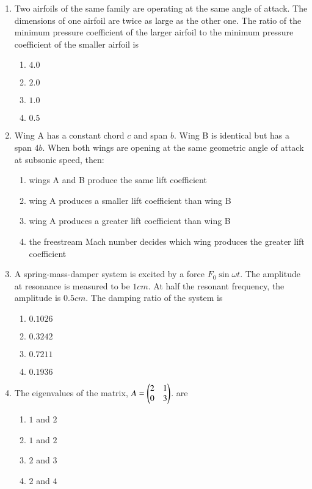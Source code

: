 \documentclass[journal]{IEEEtran}
\begin{document}
\begin{enumerate}
	\item 	Two airfoils of the same family are operating at the same angle of attack. The dimensions of one airfoil are twice as large as the other one. The ratio of the minimum pressure coefficient of the larger airfoil to the minimum pressure coefficient of the smaller airfoil is
		\begin{enumerate}
			\item $4.0$
    			\item $2.0$
    			\item $1.0$
    			\item $0.5$
		\end{enumerate}


	\item Wing A has a constant chord $c$ and span $b$. Wing B is identical but has a span $4b$. When both wings are opening at the same geometric angle of attack at subsonic speed, then:
		\begin{enumerate}
			\item wings A and B produce the same lift coefficient
			\item wing A produces a smaller lift coefficient than wing B
			\item wing A produces a greater lift coefficient than wing B
			\item the freestream Mach number decides which wing produces the greater lift coefficient
		\end{enumerate}


	\item A spring-mass-damper system is excited by a force $F_0 \sin \omega t$. The amplitude at resonance is measured to be $1cm$. At half the resonant frequency, the amplitude is $0.5cm$. The damping ratio of the system is
		\begin{enumerate}
			\item $0.1026$
			\item $0.3242$
			\item $0.7211$
			\item $0.1936$
		\end{enumerate}

	\item The eigenvalues of the matrix, $A = \begin{pmatrix}2&1\\0&3\end{pmatrix}$. are
		\begin{enumerate}
			\item $1$ and $2$
			\item $1$ and $2$
			\item $2$ and $3$
			\item $2$ and $4$
		\end{enumerate}


\end{enumerate}
\end{document}
